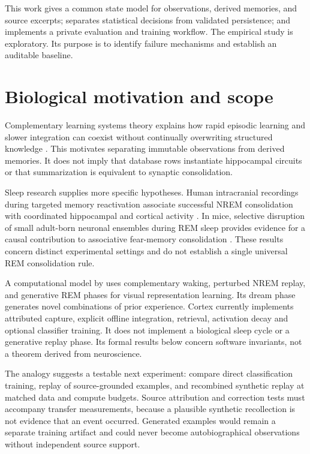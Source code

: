 \documentclass[11pt]{article}
\begin{document}
This work gives a common state model for observations, derived memories, and source excerpts; separates statistical decisions from validated persistence; and implements a private evaluation and training workflow. The empirical study is exploratory. Its purpose is to identify failure mechanisms and establish an auditable baseline.

\section{Biological motivation and scope}
Complementary learning systems theory explains how rapid episodic learning and slower integration can coexist without continually overwriting structured knowledge \citep{cls}. This motivates separating immutable observations from derived memories. It does not imply that database rows instantiate hippocampal circuits or that summarization is equivalent to synaptic consolidation.

Sleep research supplies more specific hypotheses. Human intracranial recordings during targeted memory reactivation associate successful NREM consolidation with coordinated hippocampal and cortical activity \citep{nrem2025}. In mice, selective disruption of small adult-born neuronal ensembles during REM sleep provides evidence for a causal contribution to associative fear-memory consolidation \citep{rem2025}. These results concern distinct experimental settings and do not establish a single universal REM consolidation rule.

A computational model by \citet{dreaming} uses complementary waking, perturbed NREM replay, and generative REM phases for visual representation learning. Its dream phase generates novel combinations of prior experience. Cortex currently implements attributed capture, explicit offline integration, retrieval, activation decay and optional classifier training. It does not implement a biological sleep cycle or a generative replay phase. Its formal results below concern software invariants, not a theorem derived from neuroscience.

The analogy suggests a testable next experiment: compare direct classification training, replay of source-grounded examples, and recombined synthetic replay at matched data and compute budgets. Source attribution and correction tests must accompany transfer measurements, because a plausible synthetic recollection is not evidence that an event occurred. Generated examples would remain a separate training artifact and could never become autobiographical observations without independent source support.
\end{document}
